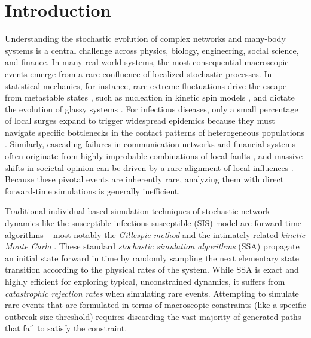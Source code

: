 \documentclass[english,10pt,aps,pra,twocolumn,superscriptaddress,floatfix,fleqn]{revtex4-2}
\begin{document}
\section{Introduction}\label{sec:intro}
Understanding the stochastic evolution of complex networks and many-body systems is a central challenge across physics, biology, engineering, social science, and finance. In many real-world systems, the most consequential macroscopic events emerge from a rare confluence of localized stochastic processes. In statistical mechanics, for instance, rare extreme fluctuations drive the escape from metastable states \cite{Haenggi1990-62}, such as nucleation in kinetic spin models \cite{Binder1987-50,Rikvold1994-49}, and dictate the evolution of glassy systems \cite{Garrahan2007-98,Chandler2010-61}. For infectious diseases, only a small percentage of local surges expand to trigger widespread epidemics because they must navigate specific bottlenecks in the contact patterns of heterogeneous populations \cite{PastorSatorras2015-87,LloydSmith2005-438,Salathe2010-6}. Similarly, cascading failures in communication networks and financial systems often originate from highly improbable combinations of local faults \cite{Albert2000-406,Acemoglu2015-105}, and massive shifts in societal opinion can be driven by a rare alignment of local influences \cite{Castellano2009-81,Watts2002-99}. Because these pivotal events are inherently rare, analyzing them with direct forward-time simulations is generally inefficient.

Traditional individual-based simulation techniques of stochastic network dynamics like the susceptible-infectious-susceptible (SIS) model \cite{Hethcote1989,Hethcote2000-42,Brauer2017-2,Rock2014-77,Brauer2019} are forward-time algorithms -- most notably the \emph{Gillespie method} \cite{Gillespie1977-81} and the intimately related \emph{kinetic Monte Carlo} \cite{Bortz1975-17}. These standard \emph{stochastic simulation algorithms} (SSA) propagate an initial state forward in time by randomly sampling the next elementary state transition according to the physical rates of the system. While SSA is exact and highly efficient for exploring typical, unconstrained dynamics, it suffers from \emph{catastrophic rejection rates} when simulating rare events. Attempting to simulate rare events that are formulated in terms of macroscopic constraints (like a specific outbreak-size threshold) requires discarding the vast majority of generated paths that fail to satisfy the constraint.
\end{document}
